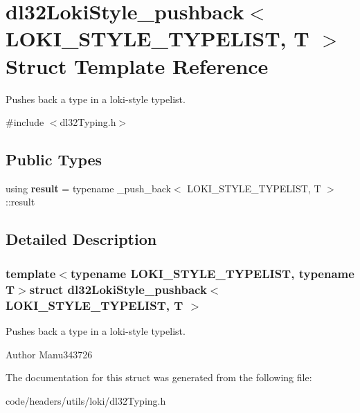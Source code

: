 \hypertarget{structdl32_loki_style__pushback}{\section{dl32\-Loki\-Style\-\_\-pushback$<$ L\-O\-K\-I\-\_\-\-S\-T\-Y\-L\-E\-\_\-\-T\-Y\-P\-E\-L\-I\-S\-T, T $>$ Struct Template Reference}
\label{structdl32_loki_style__pushback}
}


Pushes back a type in a loki-\/style typelist.  




{\ttfamily \#include $<$dl32\-Typing.\-h$>$}

\subsection*{Public Types}
\begin{DoxyCompactItemize}
\item 
\hypertarget{structdl32_loki_style__pushback_a62da1fb4410b76e82f2819384e03437c}{using {\bfseries result} = typename \-\_\-push\-\_\-back$<$ L\-O\-K\-I\-\_\-\-S\-T\-Y\-L\-E\-\_\-\-T\-Y\-P\-E\-L\-I\-S\-T, T $>$\-::result}\label{structdl32_loki_style__pushback_a62da1fb4410b76e82f2819384e03437c}

\end{DoxyCompactItemize}


\subsection{Detailed Description}
\subsubsection*{template$<$typename L\-O\-K\-I\-\_\-\-S\-T\-Y\-L\-E\-\_\-\-T\-Y\-P\-E\-L\-I\-S\-T, typename T$>$struct dl32\-Loki\-Style\-\_\-pushback$<$ L\-O\-K\-I\-\_\-\-S\-T\-Y\-L\-E\-\_\-\-T\-Y\-P\-E\-L\-I\-S\-T, T $>$}

Pushes back a type in a loki-\/style typelist. 

\begin{DoxyAuthor}{Author}
Manu343726 
\end{DoxyAuthor}


The documentation for this struct was generated from the following file\-:\begin{DoxyCompactItemize}
\item 
code/headers/utils/loki/dl32\-Typing.\-h\end{DoxyCompactItemize}
